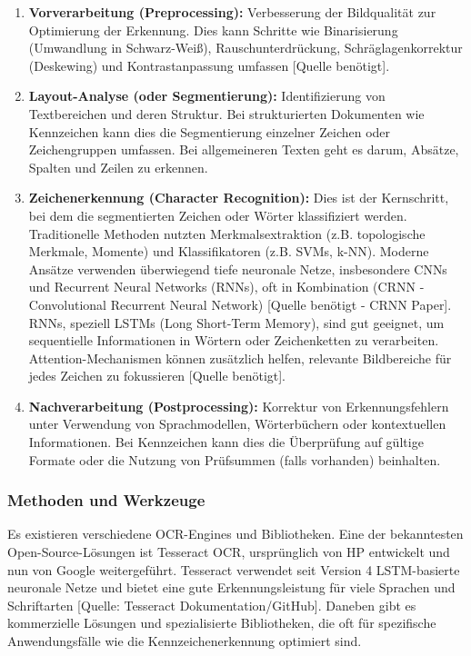 \begin{enumerate}
    \item \textbf{Vorverarbeitung (Preprocessing):} Verbesserung der Bildqualität zur Optimierung der Erkennung. Dies kann Schritte wie Binarisierung (Umwandlung in Schwarz-Weiß), Rauschunterdrückung, Schräglagenkorrektur (Deskewing) und Kontrastanpassung umfassen [Quelle benötigt].

    \item \textbf{Layout-Analyse (oder Segmentierung):} Identifizierung von Textbereichen und deren Struktur. Bei strukturierten Dokumenten wie Kennzeichen kann dies die Segmentierung einzelner Zeichen oder Zeichengruppen umfassen. Bei allgemeineren Texten geht es darum, Absätze, Spalten und Zeilen zu erkennen.

    \item \textbf{Zeichenerkennung (Character Recognition):} Dies ist der Kernschritt, bei dem die segmentierten Zeichen oder Wörter klassifiziert werden. Traditionelle Methoden nutzten Merkmalsextraktion (z.B. topologische Merkmale, Momente) und Klassifikatoren (z.B. SVMs, k-NN). Moderne Ansätze verwenden überwiegend tiefe neuronale Netze, insbesondere CNNs und Recurrent Neural Networks (RNNs), oft in Kombination (CRNN - Convolutional Recurrent Neural Network) [Quelle benötigt - CRNN Paper]. RNNs, speziell LSTMs (Long Short-Term Memory), sind gut geeignet, um sequentielle Informationen in Wörtern oder Zeichenketten zu verarbeiten. Attention-Mechanismen können zusätzlich helfen, relevante Bildbereiche für jedes Zeichen zu fokussieren [Quelle benötigt].

    \item \textbf{Nachverarbeitung (Postprocessing):} Korrektur von Erkennungsfehlern unter Verwendung von Sprachmodellen, Wörterbüchern oder kontextuellen Informationen. Bei Kennzeichen kann dies die Überprüfung auf gültige Formate oder die Nutzung von Prüfsummen (falls vorhanden) beinhalten.
\end{enumerate}

\subsubsection{Methoden und Werkzeuge}
Es existieren verschiedene OCR-Engines und Bibliotheken. Eine der bekanntesten Open-Source-Lösungen ist Tesseract OCR, ursprünglich von HP entwickelt und nun von Google weitergeführt. Tesseract verwendet seit Version 4 LSTM-basierte neuronale Netze und bietet eine gute Erkennungsleistung für viele Sprachen und Schriftarten [Quelle: Tesseract Dokumentation/GitHub]. Daneben gibt es kommerzielle Lösungen und spezialisierte Bibliotheken, die oft für spezifische Anwendungsfälle wie die Kennzeichenerkennung optimiert sind.

